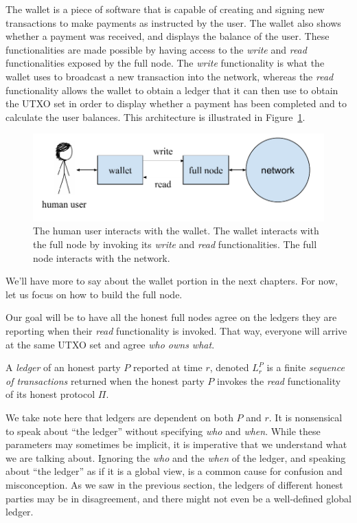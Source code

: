The wallet is a piece of software that is capable of creating and signing
new transactions to make payments as instructed by the user. The wallet also shows
whether a payment was received, and displays the balance of the user. These functionalities
are made possible by having access to the \emph{write} and \emph{read} functionalities
exposed by the full node. The \emph{write} functionality is what the wallet uses to
broadcast a new transaction into the network, whereas the \emph{read} functionality
allows the wallet to obtain a ledger that it can then use to obtain the UTXO set
in order to display whether a payment has been completed and to calculate the user
balances. This architecture is illustrated in Figure~\ref{fig.wallet-fullnode-architecture}.

\begin{figure}[h]
    \centering
    \includegraphics[width=0.65 \columnwidth,keepaspectratio]{figures/wallet-fullnode-architecture.pdf}
    \caption{The human user interacts with the wallet. The wallet interacts with the full node
    by invoking its \emph{write} and \emph{read} functionalities. The full node interacts with the network.}
    \label{fig.wallet-fullnode-architecture}
\end{figure}

We'll have more to say about the wallet portion in the next chapters. For now,
let us focus on how to build the full node.

Our goal will be to have all the honest full nodes agree on the ledgers they are reporting
when their \emph{read} functionality is invoked. That way, everyone will arrive at the same
UTXO set and agree \emph{who owns what}.

\begin{definition}[Ledger]
    A \emph{ledger} of an honest party $P$ reported at time $r$, denoted $L^P_r$ is
    a finite \emph{sequence of transactions} returned when the honest party $P$ invokes
    the \emph{read} functionality of its honest protocol $\Pi$.
\end{definition}

We take note here that ledgers are dependent on both $P$ and $r$. It is nonsensical to
speak about ``the ledger'' without specifying \emph{who} and \emph{when}. While these
parameters may sometimes be implicit, it is imperative that we understand what we are
talking about. Ignoring the \emph{who} and the \emph{when} of the ledger, and speaking
about ``the ledger'' as if it is a global view, is a common cause for confusion and
misconception. As we saw in the previous section, the ledgers of different honest
parties may be in disagreement, and there might not even be a well-defined global
ledger.

